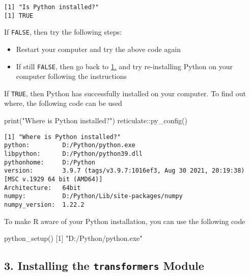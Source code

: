 \documentclass[
]{article}
\newenvironment{Shaded}{\begin{snugshade}}{\end{snugshade}}
\newcommand{\DecValTok}[1]{\textcolor[rgb]{0.00,0.00,0.81}{#1}}
\newcommand{\FunctionTok}[1]{\textcolor[rgb]{0.00,0.00,0.00}{#1}}
\newcommand{\NormalTok}[1]{#1}
\newcommand{\SpecialCharTok}[1]{\textcolor[rgb]{0.00,0.00,0.00}{#1}}
\newcommand{\StringTok}[1]{\textcolor[rgb]{0.31,0.60,0.02}{#1}}
\begin{document}
\begin{verbatim}
[1] "Is Python installed?"
[1] TRUE
\end{verbatim}

If \texttt{FALSE}, then try the following steps:

\begin{itemize}
\item
  Restart your computer and try the above code again
\item
  If still \texttt{FALSE}, then go back to
  \protect\hyperlink{section_1}{1.} and try re-installing Python on your
  computer following the instructions
\end{itemize}

If \texttt{TRUE}, then Python has successfully installed on your
computer. To find out where, the following code can be used

\begin{Shaded}
\begin{Highlighting}[]
\FunctionTok{print}\NormalTok{(}\StringTok{"Where is Python installed?"}\NormalTok{)}
\NormalTok{reticulate}\SpecialCharTok{::}\FunctionTok{py\_config}\NormalTok{()}
\end{Highlighting}
\end{Shaded}

\begin{verbatim}
[1] "Where is Python installed?"
python:         D:/Python/python.exe
libpython:      D:/Python/python39.dll
pythonhome:     D:/Python
version:        3.9.7 (tags/v3.9.7:1016ef3, Aug 30 2021, 20:19:38) [MSC v.1929 64 bit (AMD64)]
Architecture:   64bit
numpy:          D:/Python/Lib/site-packages/numpy
numpy_version:  1.22.2
\end{verbatim}

To make R aware of your Python installation, you can use the following
code

\begin{Shaded}
\begin{Highlighting}[]
\FunctionTok{python\_setup}\NormalTok{()}
\NormalTok{[}\DecValTok{1}\NormalTok{] }\StringTok{"D:/Python/python.exe"}
\end{Highlighting}
\end{Shaded}

\hypertarget{installing-the-transformers-module}{%
\subsection{\texorpdfstring{3. Installing the \texttt{transformers}
Module}{3. Installing the transformers Module}}\label{installing-the-transformers-module}}
\end{document}
